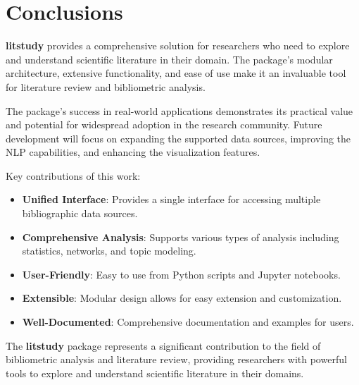 \section{Conclusions}

\textbf{litstudy} provides a comprehensive solution for researchers who need to explore and understand scientific literature in their domain. The package's modular architecture, extensive functionality, and ease of use make it an invaluable tool for literature review and bibliometric analysis.

The package's success in real-world applications demonstrates its practical value and potential for widespread adoption in the research community. Future development will focus on expanding the supported data sources, improving the NLP capabilities, and enhancing the visualization features.

Key contributions of this work:

\begin{itemize}
\item \textbf{Unified Interface}: Provides a single interface for accessing multiple bibliographic data sources.
\item \textbf{Comprehensive Analysis}: Supports various types of analysis including statistics, networks, and topic modeling.
\item \textbf{User-Friendly}: Easy to use from Python scripts and Jupyter notebooks.
\item \textbf{Extensible}: Modular design allows for easy extension and customization.
\item \textbf{Well-Documented}: Comprehensive documentation and examples for users.
\end{itemize}

The \textbf{litstudy} package represents a significant contribution to the field of bibliometric analysis and literature review, providing researchers with powerful tools to explore and understand scientific literature in their domains.
